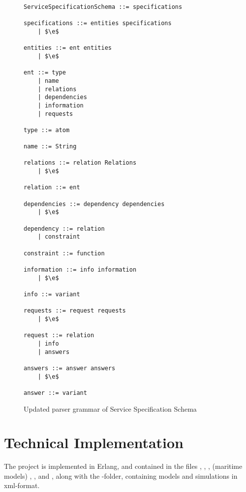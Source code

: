 \begin{figure}
	\centering
	\begin{lstlisting}[keywordstyle={}]
ServiceSpecificationSchema ::= specifications

specifications ::= entities specifications
    | $\e$
     
entities ::= ent entities
    | $\e$

ent ::= type
    | name
    | relations
    | dependencies
    | information
    | requests

type ::= atom

name ::= String

relations ::= relation Relations
    | $\e$

relation ::= ent

dependencies ::= dependency dependencies
    | $\e$

dependency ::= relation
    | constraint

constraint ::= function

information ::= info information
    | $\e$

info ::= variant

requests ::= request requests
    | $\e$

request ::= relation
    | info
    | answers

answers ::= answer answers
    | $\e$

answer ::= variant
	\end{lstlisting}
	\caption{Updated parser grammar of Service Specification Schema}
	\label{fig:sSpecUpd}
\end{figure}

\section{Technical Implementation}
The project is implemented in Erlang, and contained in the files , , , (maritime models) , , and , along with the -folder, containing models and simulations in xml-format.

